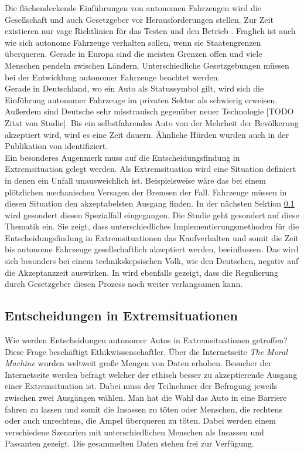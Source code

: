 Die flächendeckende Einführungen von autonomen Fahrzeugen wird die Gesellschaft und auch Gesetzgeber vor Herausforderungen stellen. Zur Zeit existieren nur vage Richtlinien für das Testen und den Betrieb \cite{doi:10.1080/01441647.2018.1494640}. Fraglich ist auch wie sich autonome Fahrzeuge verhalten sollen, wenn sie Staatengrenzen überqueren. Gerade in Europa sind die meisten Grenzen offen und viele Menschen pendeln zwischen Ländern. Unterschiedliche Gesetzgebungen müssen bei der Entwicklung autonomer Fahrzeuge beachtet werden.\\

Gerade in Deutschland, wo ein Auto als Statussymbol gilt, wird sich die Einführung autonomer Fahrzeuge im privaten Sektor als schwierig erweisen. Außerdem sind Deutsche sehr misstrauisch gegenüber neuer Technologie [TODO Zitat von Studie]. Bis ein selbstfahrendes Auto von der Mehrheit der Bevölkerung akzeptiert wird, wird es eine Zeit dauern. Ähnliche Hürden wurden auch in der Publikation \cite{roadblocks} von \citeauthor{roadblocks} identifiziert.\\

Ein besonderes Augenmerk muss auf die Entscheidungsfindung in Extremsituation gelegt werden. Als Extremsituation wird eine Situation definiert in denen ein Unfall unausweichlich ist. Beispielsweise wäre das bei einem plötzlichen mechanischen Versagen der Bremsen der Fall. Fahrzeuge müssen in diesen Situation den akzeptabelsten Ausgang finden. In der nächsten Sektion \ref{ssec:entscheidungen-in-extremsituationen} wird gesondert diesen Spezialfall eingegangen. Die Studie \cite{socialDilemma} geht gesondert auf diese Thematik ein. Sie zeigt, dass unterschiedliches Implementierungsmethoden für die Entscheidungsfindung in Extremsituationen das Kaufverhalten und somit die Zeit bis autonome Fahrzeuge gesellschaftlich akzeptiert werden, beeinflussen. Das wird sich besonders bei einem technikskepsischen Volk, wie den Deutschen, negativ auf die Akzeptanzzeit auswirken. In \citeauthor{socialDilemma} wird ebenfalls gezeigt, dass die Regulierung durch Gesetzgeber diesen Prozess noch weiter verlangsamen kann.\\


\subsection{Entscheidungen in Extremsituationen}
\label{ssec:entscheidungen-in-extremsituationen}

Wie werden Entscheidungen autonomer Autos in Extremsituationen getroffen? Diese Frage beschäftigt Ethikwissenschaftler. Über die Internetseite \textit{The Moral Machine} wurden weltweit große Mengen von Daten erhoben. Besucher der Internetseite werden befragt welcher der ethisch besser zu akzeptierende Ausgang einer Extremsituation ist. Dabei muss der Teilnehmer der Befragung jeweils zwischen zwei Ausgängen wählen. Man hat die Wahl das Auto in eine Barriere fahren zu lassen und somit die Insassen zu töten oder Menschen, die rechtens oder auch unrechtens, die Ampel überqueren zu töten. Dabei werden einem verschiedene Szenarien mit unterschiedlichen Menschen als Insassen und Passanten gezeigt. Die gesammelten Daten stehen frei zur Verfügung.\\

